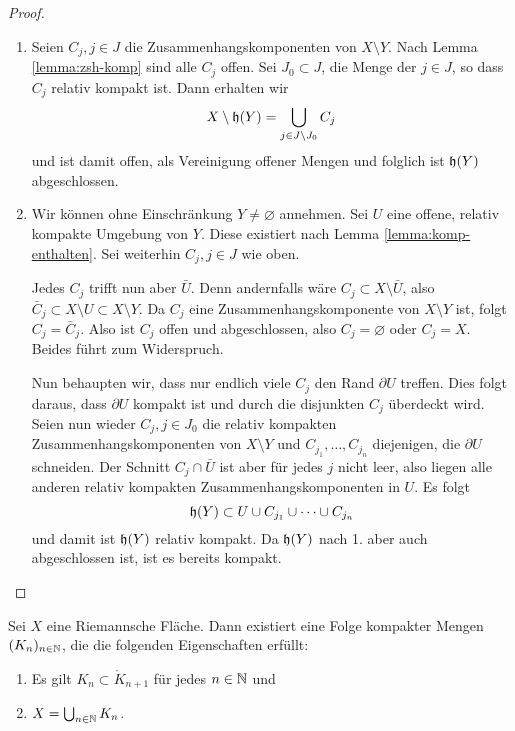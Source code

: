 \begin{proof}
  \begin{enumerate}
  \item Seien $C_j, j \in J$ die Zusammenhangskomponenten von $X
    \setminus Y$. Nach Lemma \ref{lemma:zsh-komp} sind alle $C_j$ offen.
    Sei $J_0 \subset J$, die Menge der $j \in J$, so dass $C_j$
    relativ kompakt ist. Dann erhalten wir
    \[
    X \setminus \mathfrak{h}(Y) = \bigcup_{j \in J\setminus J_0} C_j
    \]
    und ist damit offen, als Vereinigung offener Mengen und folglich
    ist $\mathfrak{h}(Y)$ abgeschlossen.
  \item Wir können ohne Einschränkung $Y \neq \varnothing$
    annehmen. Sei $U$ eine offene, relativ kompakte Umgebung von
    $Y$. Diese existiert nach Lemma \ref{lemma:komp-enthalten}.
    Sei weiterhin $C_j, j\in J$ wie oben.

    Jedes $C_j$ trifft nun aber $\bar U$. Denn andernfalls wäre $C_j
    \subset X \setminus \bar U$, also $\bar C_j
    \subset X \setminus U \subset X \setminus Y$. Da $C_j$ eine
    Zusammenhangskomponente von $X \setminus Y$ ist, folgt $C_j =
    \bar C_j$. Also ist $C_j$ offen und abgeschlossen, also $C_j =
    \varnothing$ oder $C_j = X$. Beides führt zum Widerspruch.

    Nun behaupten wir, dass nur endlich viele $C_j$ den Rand $\partial
    U$ treffen. 
    Dies folgt daraus, dass $\partial U$ kompakt ist und durch die
    disjunkten $C_j$ überdeckt wird.
    Seien nun wieder $C_j, j \in J_0$ die relativ kompakten
    Zusammenhangskomponenten von $X \setminus Y$ und $C_{j_1}, \dots,
    C_{j_n}$ diejenigen, die $\partial U$ schneiden. Der Schnitt $C_j
    \cap \bar U$ ist aber für jedes $j$ nicht leer, also liegen alle
    anderen relativ kompakten Zusammenhangskomponenten in
    $U$. Es folgt
    \[
    \mathfrak{h}(Y) \subset U \cup C_{j_1} \cup \dots \cup C_{j_n}
    \]
    und damit ist $\mathfrak{h}(Y)$ relativ kompakt. Da $\mathfrak{h}(Y)$ nach 1. aber auch
    abgeschlossen ist, ist es bereits kompakt.
  \end{enumerate}
\end{proof}


\begin{thm}
  \label{thm:kompakte-ausschöpfung}
  Sei $X$ eine Riemannsche Fläche. Dann existiert eine Folge kompakter Mengen
  $(K_n)_{n \in \mathbb{N}}$, die die folgenden Eigenschaften erfüllt:
  \begin{enumerate}
  \item Es gilt $K_n \subset \mathring K_{n+1}$ für jedes $n \in \mathbb{N}$ und
  \item $X = \bigcup_{n \in \mathbb{N}} K_n$.
  \end{enumerate}
\end{thm}

